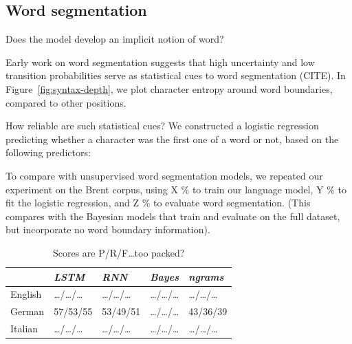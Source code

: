 \subsection{Word segmentation}
\label{sec:segmentation}


Does the model develop an implicit notion of word?

Early work on word segmentation suggests that high uncertainty and low transition probabilities serve as statistical cues to word segmentation (CITE).
In Figure~\ref{fig:syntax-depth}, we plot character entropy around word boundaries, compared to other positions.

How reliable are such statistical cues?
We constructed a logistic regression predicting whether a character was the first one of a word or not, based on the following predictors:


To compare with unsupervised word segmentation models, we repeated our experiment on the Brent corpus, using X \% to train our language model, Y \% to fit the logistic regression, and Z \% to evaluate word segmentation.
(This compares with the Bayesian models that train and evaluate on the full dataset, but incorporate no word boundary information).




%
%
%
%


\begin{table}[t]
  \begin{center}
    \begin{tabular}{l|l|l|l|l}
      \multicolumn{1}{c}{}&\emph{LSTM}&\emph{RNN}&\emph{Bayes}&\emph{ngrams}\\
      \hline
      English &\ldots{}/\ldots{}/\ldots & \ldots{}/\ldots{}/\ldots & \ldots{}/\ldots{}/\ldots &\ldots{}/\ldots{}/\ldots\\
      German & 57/53/55 & 53/49/51 & \ldots{}/\ldots{}/\ldots & 43/36/39 \\
      Italian &\ldots{}/\ldots{}/\ldots & \ldots{}/\ldots{}/\ldots & \ldots{}/\ldots{}/\ldots &\ldots{}/\ldots{}/\ldots\\
    \end{tabular}
  \end{center}
  \caption{\label{tab:segmentation-results} Scores are P/R/F\ldots too packed?}
\end{table}



